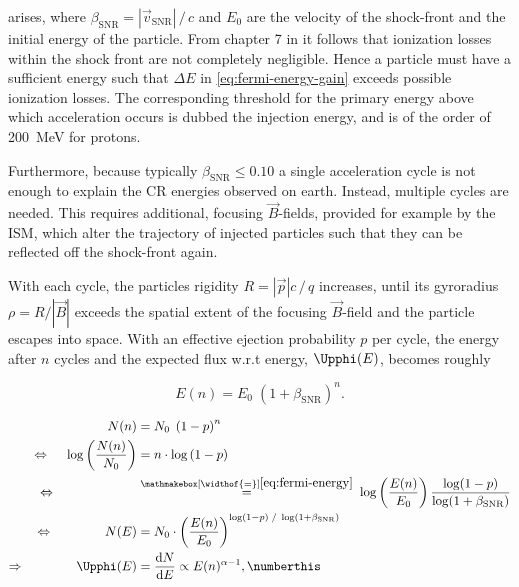 arises, where $\beta_\text{SNR} = |\vec{v}_\text{SNR}|\,/\,c$ and $E_0$ are the velocity of the shock-front and the initial energy of the particle. From chapter 7 
in \cite{fermi1949origin} it follows that ionization losses within the shock front are not completely negligible. Hence a particle must have a sufficient energy 
such that $\Delta E$ in \autoref{eq:fermi-energy-gain} exceeds possible ionization losses. The corresponding threshold for the primary energy above which 
acceleration occurs is dubbed the injection energy, and is of the order of \SI{200}{\mega\electronvolt} for protons. 

Furthermore, because typically $\beta_\text{SNR} \leq 0.10$ a single acceleration cycle is not enough to explain the CR energies observed on earth. Instead, 
multiple cycles are needed. This requires additional, focusing $\vec{B}$-fields, provided for example by the ISM, which alter the trajectory of injected particles 
such that they can be reflected off the shock-front again.

With each cycle, the particles rigidity $R = |\vec{p}|c\,/\,q$ increases, until its gyroradius $\rho = R / |\vec{B}|$ exceeds the spatial extent of the focusing 
$\vec{B}$-field and the particle escapes into space. With an effective ejection probability $p$ per cycle, the energy after $n$ cycles and the expected flux w.r.t
energy, $\Upphi(E)$, becomes roughly

\begin{equation}
\label{eq:fermi-energy}
E(n) = E_0\;\left( 1 + \beta_\text{SNR} \right)^n.
\end{equation}

\begin{align*}
                                                        N(n) &= N_0 \;\left( 1 - p \right)^n \\
\Leftrightarrow\;\;\;\;\,\log\left( \frac{N(n)}{N_0} \right) &= n\cdot\log\left( 1-p \right) \\ 
\Leftrightarrow\qquad\qquad\qquad\;\;&\stackrel{\mathmakebox[\widthof{=}]{\eqref{eq:fermi-energy}}}{=}\;\log\left( \frac{E(n)}{E_0} \right) 
\frac{\log(1-p)}{\log(1+\beta_\text{SNR})} \\
\Leftrightarrow\qquad\qquad                             N(E) &= N_0\cdot\left( \frac{E(n)}{E_0} \right)^{\log(1 - p)\;/\;\log(1 + \beta_\text{SNR})} \\
\Rightarrow \qquad\qquad                           \Upphi(E) &= \frac{ \text{d}N }{ \text{d}E } \propto E(n)^{\alpha - 1}, \numberthis\label{eq:fermi-spectrum}
\end{align*}

